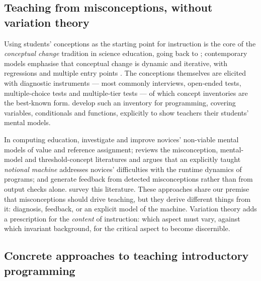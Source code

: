 \subsection{Teaching from misconceptions, without variation theory}

Using students' conceptions as the starting point for instruction is the core
of the \emph{conceptual change} tradition in science education, going back to
\textcite{Posner1982ConceptualChange}; contemporary models emphasise that
conceptual change is dynamic and iterative, with regressions and multiple entry
points \autocite{Nadelson2018ConceptualChange}. The conceptions themselves are
elicited with diagnostic instruments --- most commonly interviews, open-ended
tests, multiple-choice tests and multiple-tier tests
\autocite{KaltakciGurel2015Diagnostics} --- of which concept inventories are
the best-known form. \Textcite{Julie2020ConceptInventory} develop such an
inventory for programming, covering variables, conditionals and functions,
explicitly to show teachers their students' mental models.

In computing education, \textcite{Ma2011MentalModels} investigate and improve
novices' non-viable mental models of value and reference assignment;
\textcite{Sorva2013NotionalMachines} reviews the misconception, mental-model
and threshold-concept literatures and argues that an explicitly taught
\emph{notional machine} addresses novices' difficulties with the runtime
dynamics of programs; and \textcite{Gusukuma2018MDF} generate feedback from
detected misconceptions rather than from output checks alone.
\Textcite{MisconceptionsSurvey2017} survey this literature. These approaches
share our premise that misconceptions should drive teaching, but they derive
different things from it: diagnosis, feedback, or an explicit model of the
machine. Variation theory adds a prescription for the \emph{content} of
instruction: which aspect must vary, against which invariant background, for
the critical aspect to become discernible.

\subsection{Concrete approaches to teaching introductory programming}

